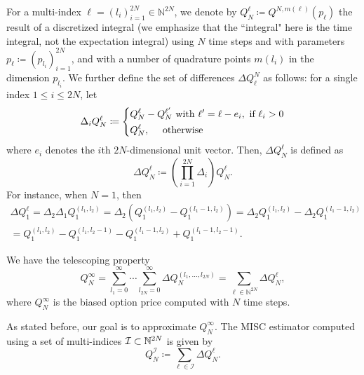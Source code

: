 
For a multi-index $\ell = (l_i)_{i=1}^{2N} \in \mathbb{N}^{2N}$, we denote  by
$Q_N^\ell \coloneqq Q^{N,m(\ell)}(p_{\ell})$ the result of a discretized
integral (we emphasize that the ``integral" here is the  time integral, not the expectation integral) using $N$ time steps and with parameters $p_\ell \coloneqq (p_{l_i})_{i=1}^{2N}$, and with a number of quadrature points $m(l_i)$ in the dimension $p_{l_i}$. We further define the set of
differences $\Delta Q^N_\ell$ as follows: for a single index $1 \le i \le 2N$,
let
\begin{equation}
\Delta_i Q_N^\ell \coloneqq \left\{ 
\aligned 
 Q_N^{\ell} &- Q_N^{\ell'}  \text{ with } \ell' =\ell - e_i, \text{ if } \ell_i>0 \\
 Q_N^\ell &, \quad  \text{ otherwise}
\endaligned
\right.
\end{equation}
where $e_i$ denotes the $i$th $2N$-dimensional unit vector. Then, $\Delta
Q_N^\ell$ is defined as
\begin{equation}
\Delta Q_N^\ell \coloneqq \left( \prod_{i=1}^{2N} \Delta_i \right) Q_N^\ell.
\end{equation}
For instance, when $N = 1$, then 
\begin{multline*}
	\Delta Q_1^\ell = \Delta_2 \Delta_1 Q_1^{(l_1, l_2)} = \Delta_2\left( Q_1^{(l_1,
		l_2)} - Q_1^{(l_1-1,l_2)} \right) = \Delta_2 Q_1^{(l_1,
		l_2)} - \Delta_2 Q_1^{(l_1-1,l_2)} 
	\\= Q_1^{(l_1, l_2)} - Q_1^{(l_1, l_2-1)} - Q_1^{(l_1-1, l_2)} + Q_1^{(l_1-1, l_2-1)}.
\end{multline*}

We have the telescoping property
\begin{equation}
Q_N^\infty = \sum_{l_1=0}^\infty \cdots \sum_{l_{2N} = 0}^\infty \Delta
Q_N^{(l_1, \ldots, l_{2N})} = \sum_{\ell \in \mathbb{N}^{2N}} \Delta Q_N^\ell,
\end{equation}
where $Q^\infty_N$ is the biased option price computed with $N$ time steps.

As stated before, our goal is to approximate $Q^{\infty}_{N}$. The MISC estimator computed using a set of multi-indices $\mathcal{I}\subset \mathbb{N}^{2N}$ is given by
\begin{equation*}
	Q_N^{\mathcal{I}} \coloneqq \sum_{\ell \in \mathcal{I}} \Delta Q_N^\ell.
\end{equation*}

